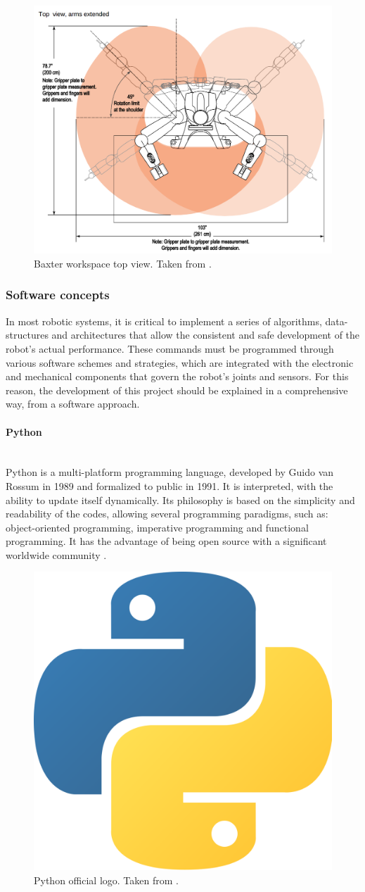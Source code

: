 \documentclass[11pt]{report} %
\newcommand{\subsubsubsection}[1]{\paragraph{#1}\mbox{}\\}
\begin{document}
\begin{figure}[H]
    \centering
    \includegraphics[width=0.65\linewidth]{assets/imgs/reference_framework/baxter_workspace_top_view.png}
    \caption{Baxter workspace top view. Taken from \citep{cite_baxter_workspace_from_sdk_wiki}.} 
    \label{fig_baxter_workspace_2}
\end{figure}


\subsubsection{Software concepts}

In most robotic systems, it is critical to implement a series of algorithms, data-structures and architectures that allow the consistent and safe development of the robot's actual performance. These commands must be programmed through various software schemes and strategies, which are integrated with the electronic and mechanical components that govern the robot's joints and sensors. For this reason, the development of this project should be explained in a comprehensive way, from a software approach.\\

\subsubsubsection{Python}

Python is a multi-platform programming language, developed by Guido van Rossum in 1989 and formalized to public in 1991. It is interpreted, with the ability to update itself dynamically. Its philosophy is based on the simplicity and readability of the codes, allowing several programming paradigms, such as: object-oriented programming, imperative programming and functional programming. It has the advantage of being open source with a significant worldwide community \citep{cite_python_official_site}.\\

\begin{figure}[H]
    \centering
    \includegraphics[width=0.3\linewidth]{assets/imgs/reference_framework/python_logo_main.png}
    \caption{Python official logo. Taken from \citep{cite_python_official_site}.} 
    \label{fig_python_main_logo}
\end{figure}
\end{document}
